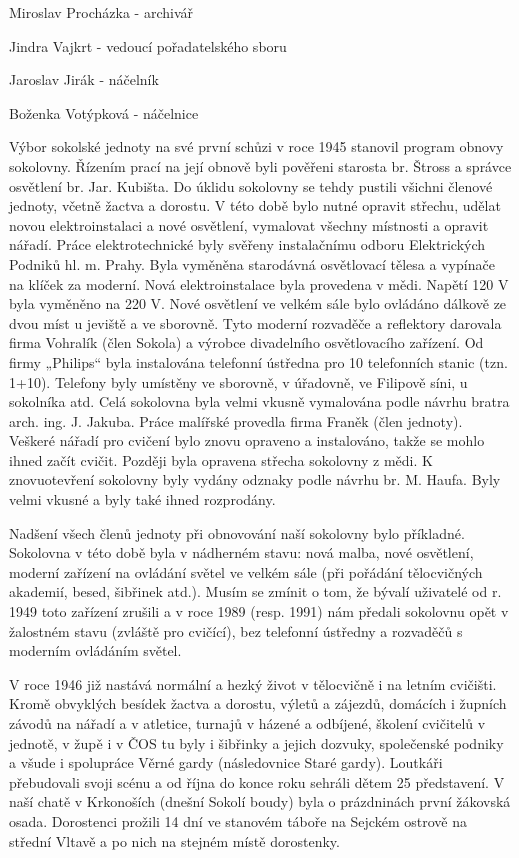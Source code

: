Miroslav Procházka - archivář

Jindra Vajkrt - vedoucí pořadatelského sboru

Jaroslav Jirák - náčelník

Boženka Votýpková - náčelnice

Výbor sokolské jednoty na své první schůzi v roce 1945 stanovil program
obnovy sokolovny. Řízením prací na její obnově byli pověřeni starosta
br. Štross a správce osvětlení br. Jar. Kubišta. Do úklidu sokolovny se
tehdy pustili všichni členové jednoty, včetně žactva a dorostu. V této
době bylo nutné opravit střechu, udělat novou elektroinstalaci a nové
osvětlení, vymalovat všechny místnosti a opravit nářadí. Práce
elektrotechnické byly svěřeny instalačnímu odboru Elektrických Podniků
hl. m. Prahy. Byla vyměněna starodávná osvětlovací tělesa a vypínače na
klíček za moderní. Nová elektroinstalace byla provedena v mědi. Napětí
120 V byla vyměněno na 220 V. Nové osvětlení ve velkém sále bylo
ovládáno dálkově ze dvou míst u jeviště a ve sborovně. Tyto moderní
rozvaděče a reflektory darovala firma Vohralík (člen Sokola) a výrobce
divadelního osvětlovacího zařízení. Od firmy „Philips`` byla instalována
telefonní ústředna pro 10 telefonních stanic (tzn. 1+10). Telefony byly
umístěny ve sborovně, v úřadovně, ve Filipově síni, u sokolníka atd.
Celá sokolovna byla velmi vkusně vymalována podle návrhu bratra arch.
ing. J. Jakuba. Práce malířské provedla firma Franěk (člen jednoty).
Veškeré nářadí pro cvičení bylo znovu opraveno a instalováno, takže se
mohlo ihned začít cvičit. Později byla opravena střecha sokolovny z
mědi. K znovuotevření sokolovny byly vydány odznaky podle návrhu br. M.
Haufa. Byly velmi vkusné a byly také ihned rozprodány.

Nadšení všech členů jednoty při obnovování naší sokolovny bylo
příkladné. Sokolovna v této době byla v nádherném stavu: nová malba,
nové osvětlení, moderní zařízení na ovládání světel ve velkém sále (při
pořádání tělocvičných akademií, besed, šibřinek atd.). Musím se zmínit o
tom, že bývalí uživatelé od r. 1949 toto zařízení zrušili a v roce 1989
(resp. 1991) nám předali sokolovnu opět v žalostném stavu (zvláště pro
cvičící), bez telefonní ústředny a rozvaděčů s moderním ovládáním
světel.

V roce 1946 již nastává normální a hezký život v tělocvičně i na letním
cvičišti. Kromě obvyklých besídek žactva a dorostu, výletů a zájezdů,
domácích i župních závodů na nářadí a v atletice, turnajů v házené a
odbíjené, školení cvičitelů v jednotě, v župě i v ČOS tu byly i šibřinky
a jejich dozvuky, společenské podniky a všude i spolupráce Věrné gardy
(následovnice Staré gardy). Loutkáři přebudovali svoji scénu a od října
do konce roku sehráli dětem 25 představení. V naší chatě v Krkonoších
(dnešní Sokolí boudy) byla o prázdninách první žákovská osada.
Dorostenci prožili 14 dní ve stanovém táboře na Sejckém ostrově na
střední Vltavě a po nich na stejném místě dorostenky.

